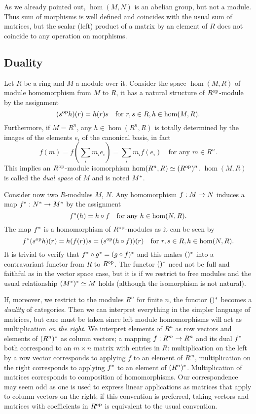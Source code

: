 As we already pointed out, $\hom(M,N)$ is an abelian group, but not a
module. Thus sum of morphisms is well defined and coincides with the
usual sum of matrices, but the scalar (left) product of a matrix by an
element of $R$ does not coincide to any operation on morphisms.


\subsection{Duality}
\label{sec:linear-algebra:duality}

Let $R$ be a ring and $M$ a module over it. Consider the space
$\hom(M,R)$ of module homomorphism from $M$ to $R$, it has a natural
structure of $R^{\mathrm{op}}$-module by the assignment
\[(s^{\mathrm{op}}h)(r) = h(r)s \quad\text{for $r,s\in R, h\in\hom(M,R)$.}\]
Furthermore, if $M=R^n$, any $h\in\hom(R^n,R)$ is totally determined
by the images of the elements $e_i$ of the canonical basis, in fact
\[f(m) = f\left(\sum_im_ie_i\right) = \sum_im_if(e_i) \quad\text{for
  any $m\in R^n$.}\] This implies an $R^{\mathrm{op}}$-module isomorphism
$\hom(R^n,R)\simeq (R^{\mathrm{op}})^n$. $\hom(M,R)$ is called the \emph{dual
  space} of $M$ and is noted $M^\ast$.

Consider now two $R$-modules $M$, $N$. Any homomorphism $f:M\rightarrow N$
induces a map $f^\ast:N^\ast\rightarrow M^\ast$ by the assignment
\[f^\ast(h) = h\circ f \quad\text{for any $h\in\hom(N,R)$.}\]
The map $f^\ast$ is a homomorphism of $R^{\mathrm{op}}$-modules as it can be
seen by
\[f^\ast(s^{\mathrm{op}}h)(r) = h(f(r))s = (s^{\mathrm{op}}(h\circ f))(r)
\quad\text{for $r,s\in R,h\in\hom(N,R)$.}\] It is trivial to verify
that $f^\ast\circ g^\ast=(g\circ f)^\ast$ and this makes
$()^\ast$ into a contravariant functor from $R$ to
$R^{\mathrm{op}}$. The functor $()^\ast$ need not be full and
faithful as in the vector space case, but it is if we restrict to free
modules and the usual relationship $(M^\ast)^\ast\simeq M$ holds
(although the isomorphism is not natural).

If, moreover, we restrict to the modules $R^n$ for finite $n$, the
functor $()^\ast$ becomes a \emph{duality} of categories. Then we
can interpret everything in the simpler language of matrices, but care
must be taken since left module homomorphisms will act as
multiplication \emph{on the right}. We interpret elements of $R^n$ as
row vectors and elements of $(R^n)^\ast$ as column vectors; a
mapping $f:R^m\rightarrow R^n$ and its dual $f^\ast$ both correspond to an
$m\times n$ matrix with entries in $R$: multiplication on the left by
a row vector corresponds to applying $f$ to an element of $R^m$,
multiplication on the right corresponds to applying $f^\ast$ to an
element of $(R^n)^\ast$. Multiplication of matrices corresponds to
composition of homomorphisms. Our correspondence may seem odd as one
is used to express linear applications as matrices that apply to
column vectors on the right; if this convention is preferred, taking
vectors and matrices with coefficients in $R^{\mathrm{op}}$ is equivalent to the
usual convention.


